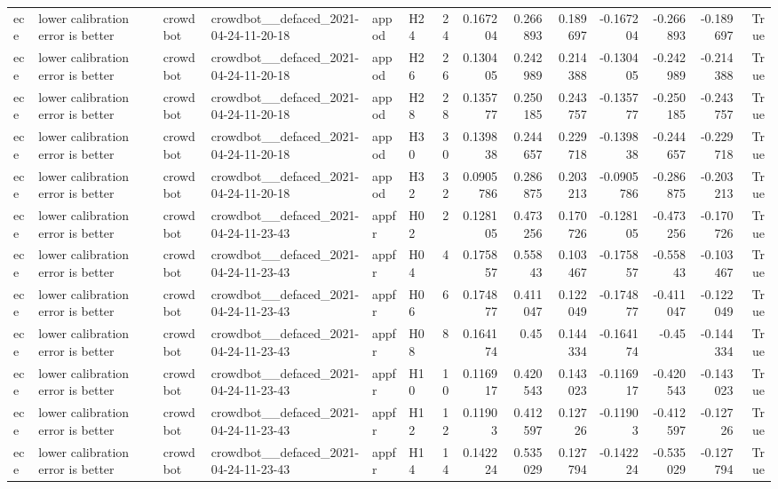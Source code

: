 \begin{longtable}{llllllrrrrrrrr}
ece & lower calibration error is better & crowdbot & crowdbot\_\_defaced\_2021-04-24-11-20-18 & appod & H24 & 24 & 0.167204 & 0.266893 & 0.189697 & -0.167204 & -0.266893 & -0.189697 & True \\
ece & lower calibration error is better & crowdbot & crowdbot\_\_defaced\_2021-04-24-11-20-18 & appod & H26 & 26 & 0.130405 & 0.242989 & 0.214388 & -0.130405 & -0.242989 & -0.214388 & True \\
ece & lower calibration error is better & crowdbot & crowdbot\_\_defaced\_2021-04-24-11-20-18 & appod & H28 & 28 & 0.135777 & 0.250185 & 0.243757 & -0.135777 & -0.250185 & -0.243757 & True \\
ece & lower calibration error is better & crowdbot & crowdbot\_\_defaced\_2021-04-24-11-20-18 & appod & H30 & 30 & 0.139838 & 0.244657 & 0.229718 & -0.139838 & -0.244657 & -0.229718 & True \\
ece & lower calibration error is better & crowdbot & crowdbot\_\_defaced\_2021-04-24-11-20-18 & appod & H32 & 32 & 0.0905786 & 0.286875 & 0.203213 & -0.0905786 & -0.286875 & -0.203213 & True \\
ece & lower calibration error is better & crowdbot & crowdbot\_\_defaced\_2021-04-24-11-23-43 & appfr & H02 & 2 & 0.128105 & 0.473256 & 0.170726 & -0.128105 & -0.473256 & -0.170726 & True \\
ece & lower calibration error is better & crowdbot & crowdbot\_\_defaced\_2021-04-24-11-23-43 & appfr & H04 & 4 & 0.175857 & 0.55843 & 0.103467 & -0.175857 & -0.55843 & -0.103467 & True \\
ece & lower calibration error is better & crowdbot & crowdbot\_\_defaced\_2021-04-24-11-23-43 & appfr & H06 & 6 & 0.174877 & 0.411047 & 0.122049 & -0.174877 & -0.411047 & -0.122049 & True \\
ece & lower calibration error is better & crowdbot & crowdbot\_\_defaced\_2021-04-24-11-23-43 & appfr & H08 & 8 & 0.164174 & 0.45 & 0.144334 & -0.164174 & -0.45 & -0.144334 & True \\
ece & lower calibration error is better & crowdbot & crowdbot\_\_defaced\_2021-04-24-11-23-43 & appfr & H10 & 10 & 0.116917 & 0.420543 & 0.143023 & -0.116917 & -0.420543 & -0.143023 & True \\
ece & lower calibration error is better & crowdbot & crowdbot\_\_defaced\_2021-04-24-11-23-43 & appfr & H12 & 12 & 0.11903 & 0.412597 & 0.12726 & -0.11903 & -0.412597 & -0.12726 & True \\
ece & lower calibration error is better & crowdbot & crowdbot\_\_defaced\_2021-04-24-11-23-43 & appfr & H14 & 14 & 0.142224 & 0.535029 & 0.127794 & -0.142224 & -0.535029 & -0.127794 & True \\

\end{longtable}
